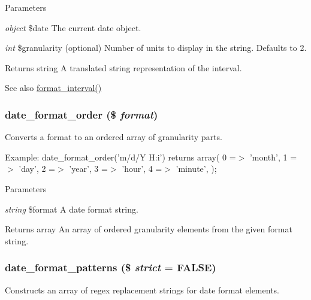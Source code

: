 \begin{DoxyParams}{Parameters}
\item[{\em object}]\$date The current date object. \item[{\em int}]\$granularity (optional) Number of units to display in the string. Defaults to 2.\end{DoxyParams}
\begin{DoxyReturn}{Returns}
string A translated string representation of the interval.
\end{DoxyReturn}
\begin{DoxySeeAlso}{See also}
\hyperlink{group__format_ga0615263857988e35c25d84c59a9733a4}{format\_\-interval()} 
\end{DoxySeeAlso}
\hypertarget{date__api_8module_afe15ee89e22483e9231870a55e689cbd}{
\subsubsection[{date\_\-format\_\-order}]{\setlength{\rightskip}{0pt plus 5cm}date\_\-format\_\-order (\$ {\em format})}}
\label{date__api_8module_afe15ee89e22483e9231870a55e689cbd}
Converts a format to an ordered array of granularity parts.

Example: date\_\-format\_\-order('m/d/Y H:i') returns array( 0 =$>$ 'month', 1 =$>$ 'day', 2 =$>$ 'year', 3 =$>$ 'hour', 4 =$>$ 'minute', );


\begin{DoxyParams}{Parameters}
\item[{\em string}]\$format A date format string.\end{DoxyParams}
\begin{DoxyReturn}{Returns}
array An array of ordered granularity elements from the given format string. 
\end{DoxyReturn}
\hypertarget{date__api_8module_a85d53d55109a56f5685f0c0ca0557a55}{
\subsubsection[{date\_\-format\_\-patterns}]{\setlength{\rightskip}{0pt plus 5cm}date\_\-format\_\-patterns (\$ {\em strict} = {\ttfamily FALSE})}}
\label{date__api_8module_a85d53d55109a56f5685f0c0ca0557a55}
Constructs an array of regex replacement strings for date format elements.


